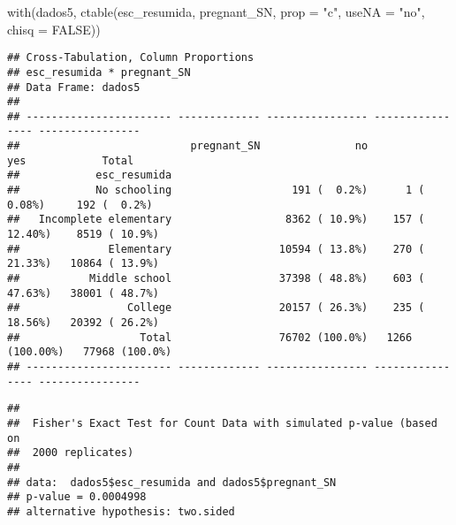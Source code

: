 \documentclass[
]{article}
\newenvironment{Shaded}{\begin{snugshade}}{\end{snugshade}}
\newcommand{\AttributeTok}[1]{\textcolor[rgb]{0.77,0.63,0.00}{#1}}
\newcommand{\CommentTok}[1]{\textcolor[rgb]{0.56,0.35,0.01}{\textit{#1}}}
\newcommand{\ConstantTok}[1]{\textcolor[rgb]{0.00,0.00,0.00}{#1}}
\newcommand{\FunctionTok}[1]{\textcolor[rgb]{0.00,0.00,0.00}{#1}}
\newcommand{\NormalTok}[1]{#1}
\newcommand{\SpecialCharTok}[1]{\textcolor[rgb]{0.00,0.00,0.00}{#1}}
\newcommand{\StringTok}[1]{\textcolor[rgb]{0.31,0.60,0.02}{#1}}
\begin{document}
\begin{Shaded}
\begin{Highlighting}[]
\FunctionTok{with}\NormalTok{(dados5, }\FunctionTok{ctable}\NormalTok{(esc\_resumida, pregnant\_SN, }\AttributeTok{prop =} \StringTok{"c"}\NormalTok{, }\AttributeTok{useNA =} \StringTok{"no"}\NormalTok{, }\AttributeTok{chisq =} \ConstantTok{FALSE}\NormalTok{))}
\end{Highlighting}
\end{Shaded}

\begin{verbatim}
## Cross-Tabulation, Column Proportions  
## esc_resumida * pregnant_SN  
## Data Frame: dados5  
## 
## ----------------------- ------------- ---------------- ---------------- ----------------
##                           pregnant_SN               no              yes            Total
##            esc_resumida                                                                 
##            No schooling                   191 (  0.2%)      1 (  0.08%)     192 (  0.2%)
##   Incomplete elementary                  8362 ( 10.9%)    157 ( 12.40%)    8519 ( 10.9%)
##              Elementary                 10594 ( 13.8%)    270 ( 21.33%)   10864 ( 13.9%)
##           Middle school                 37398 ( 48.8%)    603 ( 47.63%)   38001 ( 48.7%)
##                 College                 20157 ( 26.3%)    235 ( 18.56%)   20392 ( 26.2%)
##                   Total                 76702 (100.0%)   1266 (100.00%)   77968 (100.0%)
## ----------------------- ------------- ---------------- ---------------- ----------------
\end{verbatim}

\begin{Shaded}
\end{Shaded}

\begin{verbatim}
## 
##  Fisher's Exact Test for Count Data with simulated p-value (based on
##  2000 replicates)
## 
## data:  dados5$esc_resumida and dados5$pregnant_SN
## p-value = 0.0004998
## alternative hypothesis: two.sided
\end{verbatim}
\end{document}

